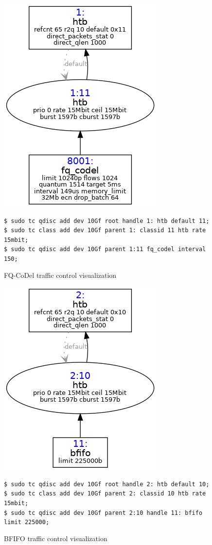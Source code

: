 \documentclass[a4paper,english, 11pt]{report}
\begin{document}
\begin{figure}[h!] %
	\centering
	\includegraphics[scale=0.60]{../diagrams/tc/tc_base_fq.png}
  	\begin{verbatim}
$ sudo tc qdisc add dev 10Gf root handle 1: htb default 11;
$ sudo tc class add dev 10Gf parent 1: classid 11 htb rate 15mbit;
$ sudo tc qdisc add dev 10Gf parent 1:11 fq_codel interval 150;
	\end{verbatim}
	\caption{FQ-CoDel traffic control visualization}
  	\label{fig:tc_base_fq}
\end{figure}


\begin{figure}[h!] %
	\centering
	\includegraphics[scale=0.60]{../diagrams/tc/tc_base_bfifo.png}
	\begin{verbatim}
$ sudo tc qdisc add dev 10Gf root handle 2: htb default 10;
$ sudo tc class add dev 10Gf parent 2: classid 10 htb rate 15mbit;
$ sudo tc qdisc add dev 10Gf parent 2:10 handle 11: bfifo limit 225000;
\end{verbatim}
  	\caption{BFIFO traffic control visualization}
  	\label{fig:tc_base_bfifo}
\end{figure}
\end{document}
